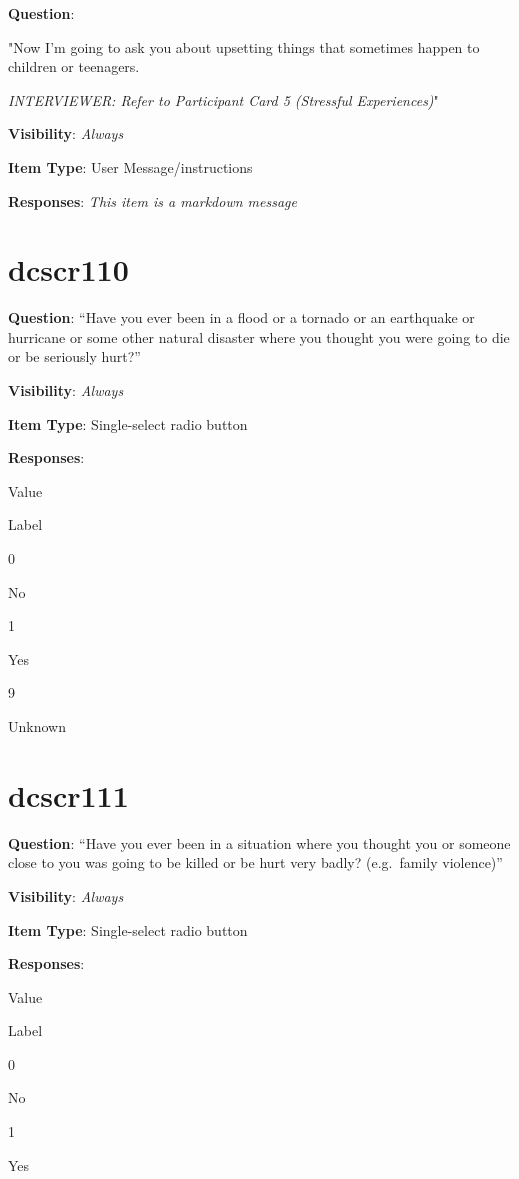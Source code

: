 \documentclass[]{book}
\begin{document}
\textbf{Question}:

"Now I'm going to ask you about upsetting things that sometimes happen to children or teenagers.

\emph{INTERVIEWER: Refer to Participant Card 5 (Stressful Experiences)}"

\textbf{Visibility}: \emph{Always}

\textbf{Item Type}: User Message/instructions

\textbf{Responses}: \emph{This item is a markdown message}

\hypertarget{dcscr110}{%
\section{dcscr110}\label{dcscr110}}

\textbf{Question}: ``Have you ever been in a flood or a tornado or an earthquake or hurricane or some other natural disaster where you thought you were going to die or be seriously hurt?''

\textbf{Visibility}: \emph{Always}

\textbf{Item Type}: Single-select radio button

\textbf{Responses}:

Value

Label

0

No

1

Yes

9

Unknown

\hypertarget{dcscr111}{%
\section{dcscr111}\label{dcscr111}}

\textbf{Question}: ``Have you ever been in a situation where you thought you or someone close to you was going to be killed or be hurt very badly? (e.g.~family violence)''

\textbf{Visibility}: \emph{Always}

\textbf{Item Type}: Single-select radio button

\textbf{Responses}:

Value

Label

0

No

1

Yes
\end{document}
